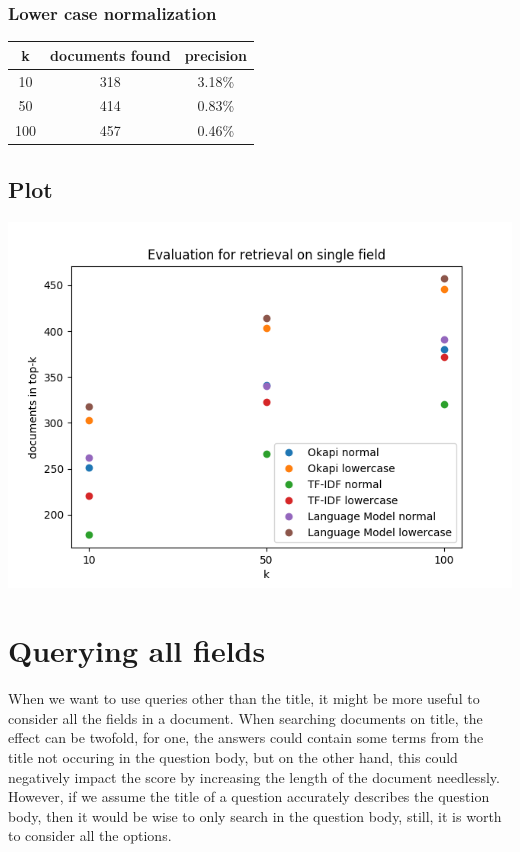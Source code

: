 \documentclass{article}
\begin{document}
\subsubsection{Lower case normalization}
\begin{center}
\begin{tabular}{|c|c|c|} \hline
\textbf{k} & \textbf{documents found} & \textbf{precision}\\ \hline
10 & 318 & 3.18\%\\
50 & 414 & 0.83\%\\
100 & 457 & 0.46\%\\ \hline

\end{tabular}
\end{center}

\subsection{Plot}
\includegraphics[width=\textwidth]{one_field}

\section{Querying all fields}
When we want to use queries other than the title, it might be more useful to consider all the fields in a document. When searching documents on title, the effect can be twofold, for one, the answers could contain some terms from the title not occuring in the question body, but on the other hand, this could negatively impact the score by increasing the length of the document needlessly. However, if we assume the title of a question accurately describes the question body, then it would be wise to only search in the question body, still, it is worth to consider all the options.
\end{document}
